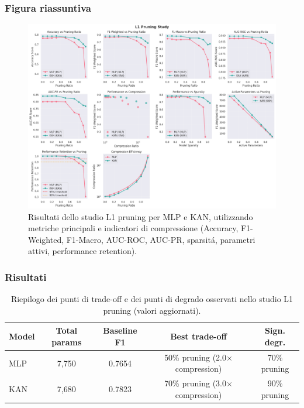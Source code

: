 \documentclass[a4paper,12pt]{report}
\begin{document}
	\subsubsection{Figura riassuntiva}
	\begin{figure}[H]
		\centering
		\includegraphics[width=1.0\textwidth]{img/abl_kanvsmlp_pm.png}
		\caption{Risultati dello studio L1 pruning per MLP e KAN, utilizzando metriche principali e indicatori di compressione (Accuracy, F1-Weighted, F1-Macro, AUC-ROC, AUC-PR, sparsitá, parametri attivi, performance retention).}
	\end{figure}
	
	\subsubsection{Risultati}
	\begin{table}[H]
		\centering
		\setlength{\tabcolsep}{2pt}
		\begin{tabular}{lcccc}
			\toprule
			\textbf{Model} & \textbf{Total params} & \textbf{Baseline F1} & \textbf{Best trade-off} & \textbf{Sign. degr.} \\
			\midrule
			MLP & 7,750   & 0.7654 & 50\% pruning (2.0$\times$ compression) & 70\% pruning \\
			KAN & 7,680   & 0.7823 & 70\% pruning (3.0$\times$ compression) & 90\% pruning \\
			\bottomrule
		\end{tabular}
		\caption{Riepilogo dei punti di trade-off e dei punti di degrado osservati nello studio L1 pruning (valori aggiornati).}
	\end{table}
	
\end{document}
